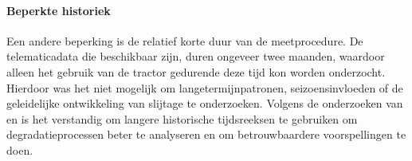 
    
    
    
    


\paragraph{Beperkte historiek}

Een andere beperking is de relatief korte duur van de meetprocedure. De telematicadata die beschikbaar zijn, duren ongeveer twee maanden, waardoor alleen het gebruik van de tractor gedurende deze tijd kon worden onderzocht. Hierdoor was het niet mogelijk om langetermijnpatronen, seizoensinvloeden of de geleidelijke ontwikkeling van slijtage te onderzoeken. Volgens de onderzoeken van \textcite{Xue2025} en \textcite{Mahfoud2025} is het verstandig om langere historische tijdsreeksen te gebruiken om degradatieprocessen beter te analyseren en om betrouwbaardere voorspellingen te doen.

